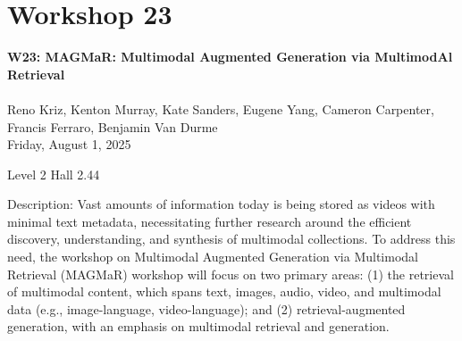 \clearpage


\section[W23: MAGMaR: Multimodal Augmented Generation via MultimodAl Retrieval ]{Workshop 23}
\label{workshop_23}

\begin{center}
    {\Large \textbf{W23: MAGMaR: Multimodal Augmented Generation via MultimodAl Retrieval }}\\
    \\


Reno Kriz, Kenton Murray, Kate Sanders, Eugene Yang, Cameron Carpenter, Francis Ferraro, Benjamin Van Durme\\

    Friday, August 1, 2025

  Level 2 Hall 2.44
    
\end{center}

Description: Vast amounts of information today is being stored as videos with minimal text metadata, necessitating further research around the efficient discovery, understanding, and synthesis of multimodal collections. To address this need, the workshop on Multimodal Augmented Generation via Multimodal Retrieval (MAGMaR) workshop will focus on two primary areas: (1) the retrieval of multimodal content, which spans text, images, audio, video, and multimodal data (e.g., image-language, video-language); and (2) retrieval-augmented generation, with an emphasis on multimodal retrieval and generation.

